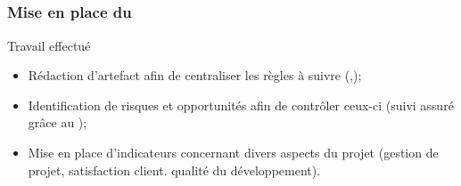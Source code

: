 \speaker{\Kafui}
\subsection{} %

\begin{frame}

\frametitle{Mise en place du \SMQ}
	\begin{block}{Travail effectué}
		\begin{itemize}
			\item Rédaction d'artefact afin de centraliser les règles à suivre (\PQ{},\PGC{});		
			\item Identification de risques et opportunités afin de contrôler ceux-ci (suivi assuré grâce au \PRO);
			\item Mise en place d'indicateurs concernant divers aspects du projet (gestion de projet, satisfaction client. qualité du développement).
		\end{itemize}      
	\end{block}
\end{frame}

